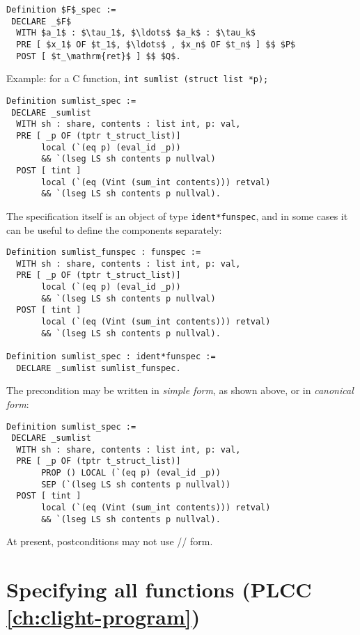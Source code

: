 \documentclass[12pt,fleqn,openany,oneside,showtrims]{memoir}
\newcommand{\ychapter}[2]{\chapter[#1]{#1 \hfill \normalsize #2}}
\begin{document}
\begin{lstlisting}
Definition $F$_spec :=
 DECLARE _$F$
  WITH $a_1$ : $\tau_1$, $\ldots$ $a_k$ : $\tau_k$
  PRE [ $x_1$ OF $t_1$, $\ldots$ , $x_n$ OF $t_n$ ] $$ $P$
  POST [ $t_\mathrm{ret}$ ] $$ $Q$.
\end{lstlisting}

Example: for a C function, \lstinline{int sumlist (struct list *p);}

\begin{lstlisting}
Definition sumlist_spec :=
 DECLARE _sumlist
  WITH sh : share, contents : list int, p: val,
  PRE [ _p OF (tptr t_struct_list)]  
       local (`(eq p) (eval_id _p))
       && `(lseg LS sh contents p nullval)
  POST [ tint ]  
       local (`(eq (Vint (sum_int contents))) retval)
       && `(lseg LS sh contents p nullval).
\end{lstlisting}

The specification itself is an object of type \lstinline{ident*funspec},
and in some cases it can be useful to define the components
separately:

\begin{lstlisting}
Definition sumlist_funspec : funspec :=
  WITH sh : share, contents : list int, p: val,
  PRE [ _p OF (tptr t_struct_list)]  
       local (`(eq p) (eval_id _p))
       && `(lseg LS sh contents p nullval)
  POST [ tint ]  
       local (`(eq (Vint (sum_int contents))) retval)
       && `(lseg LS sh contents p nullval).

Definition sumlist_spec : ident*funspec :=
  DECLARE _sumlist sumlist_funspec.
\end{lstlisting}

The precondition may be written in 
\emph{simple form}, as shown above, or in \emph{canonical form}:

\begin{lstlisting}
Definition sumlist_spec :=
 DECLARE _sumlist
  WITH sh : share, contents : list int, p: val,
  PRE [ _p OF (tptr t_struct_list)]  
       PROP () LOCAL (`(eq p) (eval_id _p)) 
       SEP (`(lseg LS sh contents p nullval))
  POST [ tint ]  
       local (`(eq (Vint (sum_int contents))) retval)
       && `(lseg LS sh contents p nullval).
\end{lstlisting}

At present, postconditions may not use \PROP/\LOCAL/\SEP{} form.

\ychapter{Specifying all functions}{\hspace{-.4in}(PLCC \autoref{ch:clight-program})}
\end{document}
